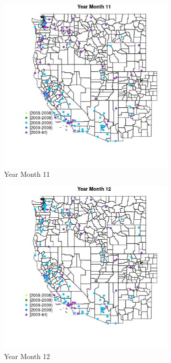 \begin{figure} 
\centering  
\includegraphics[width=0.77\textwidth]{Code_Outputs/Report_ML_input_PM25_Step4_part_e_de_duplicated_aves_MapObsMo11Year.jpg} 
\caption{\label{fig:Report_ML_input_PM25_Step4_part_e_de_duplicated_avesMapObsMo11Year}Year Month 11} 
\end{figure} 
 

\begin{figure} 
\centering  
\includegraphics[width=0.77\textwidth]{Code_Outputs/Report_ML_input_PM25_Step4_part_e_de_duplicated_aves_MapObsMo12Year.jpg} 
\caption{\label{fig:Report_ML_input_PM25_Step4_part_e_de_duplicated_avesMapObsMo12Year}Year Month 12} 
\end{figure} 
 

